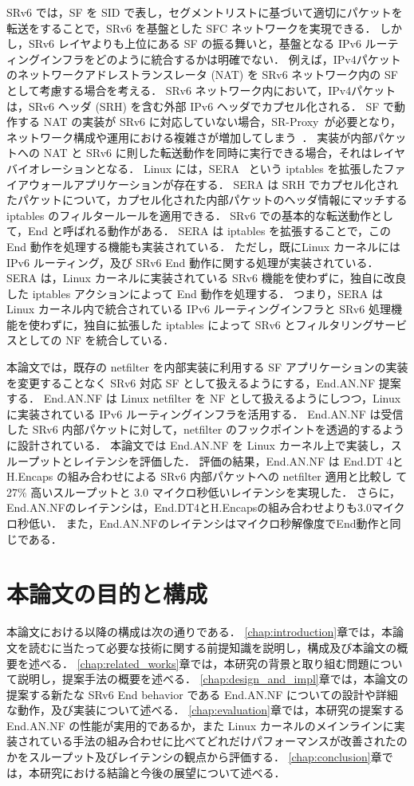 SRv6 では，SF を SID で表し，セグメントリストに基づいて適切にパケットを転送をすることで，SRv6 を基盤とした SFC ネットワークを実現できる．
しかし，SRv6 レイヤよりも上位にある SF の振る舞いと，基盤となる IPv6 ルーティングインフラをどのように統合するかは明確でない．
例えば，IPv4パケットのネットワークアドレストランスレータ (NAT) を SRv6 ネットワーク内の SF として考慮する場合を考える．
SRv6 ネットワーク内において，IPv4パケットは，SRv6 ヘッダ (SRH) を含む外部 IPv6 ヘッダでカプセル化される．
SF で動作する NAT の実装が SRv6 に対応していない場合，SR-Proxy~\cite{ietf-spring-sr-service-programming-08}が必要となり，ネットワーク構成や運用における複雑さが増加してしまう~\cite{draft-scexp}．
実装が内部パケットへの NAT と SRv6 に則した転送動作を同時に実行できる場合，それはレイヤバイオレーションとなる． 
Linux には，SERA~\cite{sera} という iptables を拡張したファイアウォールアプリケーションが存在する．
SERA は SRH でカプセル化されたパケットについて，カプセル化された内部パケットのヘッダ情報にマッチする iptables のフィルタールールを適用できる．
SRv6 での基本的な転送動作として，End と呼ばれる動作がある．
SERA は iptables を拡張することで，この End 動作を処理する機能も実装されている．
ただし，既にLinux カーネルには IPv6 ルーティング，及び SRv6 End 動作に関する処理が実装されている．
SERA は，Linux カーネルに実装されている SRv6 機能を使わずに，独自に改良した iptables アクションによって End 動作を処理する．
つまり，SERA は Linux カーネル内で統合されている IPv6 ルーティングインフラと SRv6 処理機能を使わずに，独自に拡張した iptables によって SRv6 とフィルタリングサービスとしての NF を統合している．

本論文では，既存の netfilter を内部実装に利用する SF アプリケーションの実装を変更することなく SRv6 対応 SF として扱えるようにする，End.AN.NF 提案する．
End.AN.NF は Linux netfilter を NF として扱えるようにしつつ，Linux に実装されている IPv6 ルーティングインフラを活用する．
End.AN.NF は受信した SRv6 内部パケットに対して，netfilter のフックポイントを透過的するように設計されている．
本論文では End.AN.NF を Linux カーネル上で実装し，スループットとレイテンシを評価した．
評価の結果，End.AN.NF は End.DT 4と H.Encaps の組み合わせによる SRv6 内部パケットへの netfilter 適用と比較し て27\% 高いスループットと 3.0 マイクロ秒低いレイテンシを実現した．
さらに，End.AN.NFのレイテンシは，End.DT4とH.Encapsの組み合わせよりも3.0マイクロ秒低い．
また，End.AN.NFのレイテンシはマイクロ秒解像度でEnd動作と同じである．

\section{本論文の目的と構成}
本論文における以降の構成は次の通りである．
\ref*{chap:introduction}章では，本論文を読むに当たって必要な技術に関する前提知識を説明し，構成及び本論文の概要を述べる．
\ref*{chap:related_works}章では，本研究の背景と取り組む問題について説明し，提案手法の概要を述べる．
\ref*{chap:design_and_impl}章では，本論文の提案する新たな SRv6 End behavior である End.AN.NF についての設計や詳細な動作，及び実装について述べる．
\ref*{chap:evaluation}章では，本研究の提案する End.AN.NF の性能が実用的であるか，また Linux カーネルのメインラインに実装されている手法の組み合わせに比べてどれだけパフォーマンスが改善されたのかをスループット及びレイテンシの観点から評価する．
\ref*{chap:conclusion}章では，本研究における結論と今後の展望について述べる．